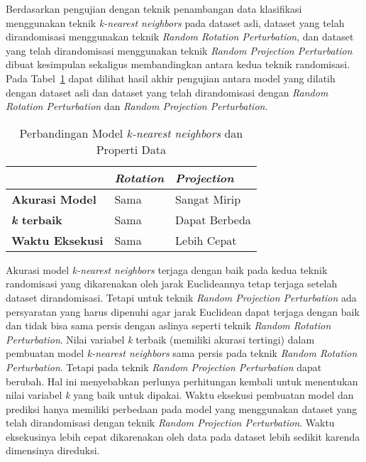 Berdasarkan pengujian dengan teknik penambangan data klasifikasi menggunakan teknik \textit{k-nearest neighbors} pada dataset asli, dataset yang telah dirandomisasi menggunakan teknik \textit{Random Rotation Perturbation}, dan dataset yang telah dirandomisasi menggunakan teknik \textit{Random Projection Perturbation} dibuat kesimpulan sekaligus membandingkan antara kedua teknik randomisasi. Pada Tabel~\ref{table:perbandingan-klasifikasi} dapat dilihat hasil akhir pengujian antara model yang dilatih dengan dataset asli dan dataset yang telah dirandomisasi dengan \textit{Random Rotation Perturbation} dan \textit{Random Projection Perturbation}.

\begin{table}
	\centering
	\caption{Perbandingan Model \textit{k-nearest neighbors} dan Properti Data}
	\begin{tabular}{|l|l|l|}
		\hline
		& \textbf{\textit{Rotation}} & \textbf{\textit{Projection}} \\ \hline
		\textbf{Akurasi Model} & Sama & Sangat Mirip \\
		\textbf{\textit{k} terbaik} & Sama & Dapat Berbeda \\
		\textbf{Waktu Eksekusi} & Sama & Lebih Cepat \\
		\hline
	\end{tabular}
	\label{table:perbandingan-klasifikasi}
\end{table}

Akurasi model \textit{k-nearest neighbors} terjaga dengan baik pada kedua teknik randomisasi yang dikarenakan oleh jarak Euclideannya tetap terjaga setelah dataset dirandomisasi. Tetapi untuk teknik \textit{Random Projection Perturbation} ada persyaratan yang harus dipenuhi agar jarak Euclidean dapat terjaga dengan baik dan tidak bisa sama persis dengan aslinya seperti teknik \textit{Random Rotation Perturbation}. Nilai variabel \textit{k} terbaik (memiliki akurasi tertingi) dalam pembuatan model \textit{k-nearest neighbors} sama persis pada teknik \textit{Random Rotation Perturbation}. Tetapi pada teknik \textit{Random Projection Perturbation} dapat berubah. Hal ini menyebabkan perlunya perhitungan kembali untuk menentukan nilai variabel \textit{k} yang baik untuk dipakai. Waktu eksekusi pembuatan model dan prediksi hanya memiliki perbedaan pada model yang menggunakan dataset yang telah dirandomisasi dengan teknik \textit{Random Projection Perturbation}. Waktu eksekusinya lebih cepat dikarenakan oleh data pada dataset lebih sedikit karenda dimensinya direduksi.

